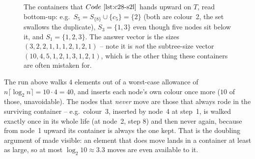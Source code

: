 \begin{figure}[H]
\centering
{}
\caption{The containers that \(\coderef{c28-s2l}\) hands upward on \(T\), read
bottom-up: e.g.\ \(S_5=S_{\{8\}}\cup\{c_5\}=\{2\}\) (both are colour~2, the
set swallows the duplicate), \(S_3=\{1,3\}\) even though five nodes sit below
it, and \(S_1=\{1,2,3\}\).  The answer vector is the sizes
\((3,2,2,1,1,1,2,1,2,1)\) -- note it is \emph{not} the subtree-size vector
\((10,4,5,1,2,1,3,1,2,1)\), which is the other thing these containers are
often mistaken for.}
\label{fig:c28-s2l}
\end{figure}

\begin{insightbox}
The run above walks \(4\) elements out of a worst-case allowance of
\(n\lceil\log_2 n\rceil=10\cdot 4=40\), and inserts each node's own colour
once more (\(10\) of those, unavoidable).  The nodes that \emph{never} move are
those that always rode in the surviving container -- e.g.\ colour~3, inserted
by node~4 at step~1, is walked exactly once in its whole life (at node~2, step
8) and then never again, because from node~1 upward its container is always
the one kept.  That is the doubling
argument of  made visible: an element that does move lands in a
container at least as large, so at most \(\log_2 10\approx3.3\) moves are even
available to it.
\end{insightbox}

